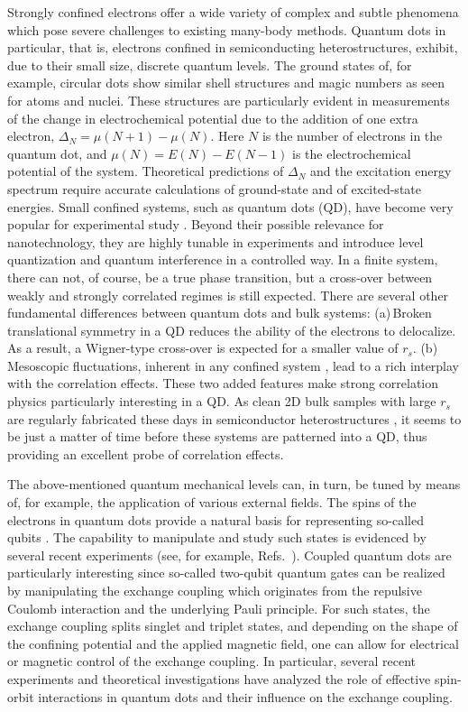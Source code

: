 Strongly confined electrons
offer a wide variety of complex and subtle phenomena which pose severe 
challenges to existing many-body methods.
Quantum dots in particular, that is, electrons confined in semiconducting heterostructures,
exhibit, due to their small size, discrete quantum levels. 
The ground states of, for example, circular dots
show similar shell structures and magic numbers 
as seen for atoms and nuclei. These structures are particularly evident in
measurements of the change in electrochemical potential due to the addition of
one extra electron, 
$\Delta_N=\mu(N+1)-\mu(N)$. Here $N$ is the number of electrons in the quantum dot, and
$\mu(N)=E(N)-E(N-1)$ is the electrochemical potential of the system.
Theoretical predictions of $\Delta_N$ and the excitation energy spectrum require
accurate calculations of ground-state and of excited-state energies.
Small confined systems, such as quantum dots (QD), have become very popular for experimental 
study \cite{MesoTran97,HeissQdotBook}. Beyond their possible relevance for nanotechnology, they are highly tunable 
in experiments and introduce level quantization and quantum interference in a controlled way. In a finite system, 
there can not, of course, be a true phase transition, but a cross-over between weakly and strongly correlated regimes is 
still expected. There are several other fundamental differences between quantum dots and bulk systems: (a)\,Broken translational 
symmetry in a QD reduces the ability of the electrons to delocalize. As a result, a Wigner-type cross-over 
is expected for a smaller value of $r_s$. (b)\,Mesoscopic fluctuations, inherent in any confined system \cite{MesoTran97,MesoHouches}, 
lead to a rich interplay with the correlation effects. These two added features make strong correlation physics particularly 
interesting in a QD. As clean 2D bulk samples with large $r_s$ are regularly fabricated these days in semiconductor 
heterostructures \cite{lowdens2DEG}, it seems to be just a matter of time before these systems are patterned into a QD, 
thus providing an excellent probe of correlation effects.



The above-mentioned quantum mechanical levels can, in turn, be tuned by means
of, for example, the application of various external fields.  
The spins of the electrons in quantum dots
provide a natural basis for representing so-called qubits \cite{divincenzo1996}. The capability to manipulate
and study such states is evidenced by several recent experiments (see, for example, Refs.~).
Coupled quantum dots are particularly interesting since so-called  
two-qubit quantum gates can be realized by manipulating the 
exchange coupling which originates from the repulsive Coulomb interaction 
and the underlying Pauli principle.  For such states, the exchange coupling splits singlet and triplet states, 
and depending on the shape of the confining potential and the applied magnetic field, one can allow
for electrical or magnetic control of the exchange coupling. In particular, several recent experiments and 
theoretical investigations have analyzed the role of effective spin-orbit interactions 
in quantum dots \cite{exp5,exp6,pederiva2010,spinorbit} and their influence on the exchange coupling.

